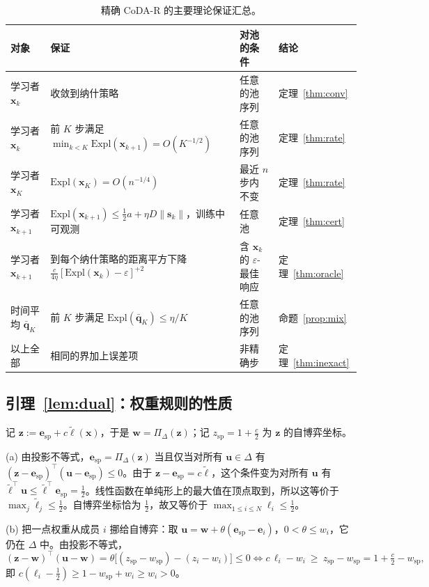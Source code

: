 \documentclass{article}
\theoremstyle{plain}
\theoremstyle{remark}
\newcommand{\Expl}{\mathrm{Expl}}
\newcommand{\Proj}{\Pi}
\newcommand{\simplex}{\Delta}
\newcommand{\bx}{{\bm{x}}}
\newcommand{\bw}{{\bm{w}}}
\newcommand{\bz}{{\bm{z}}}
\newcommand{\bu}{{\bm{u}}}
\newcommand{\bq}{{\bm{q}}}
\newcommand{\be}{{\bm{e}}}
\newcommand{\bell}{{\bm{\ell}}}
\newcommand{\aug}{\tilde{\bell}}
\newcommand{\dx}{{\bm{s}}}
\newcommand{\esp}{\be_{\mathrm{sp}}}
\newcommand{\wsp}{w_{\mathrm{sp}}}
\newcommand{\codar}{CoDA-R}
\begin{document}
\begin{table}[!htbp]
\caption{精确 \codar{} 的主要理论保证汇总。}
\label{tab:guarantees}
\begin{center}
\footnotesize
\setlength{\tabcolsep}{3.5pt}
\begin{tabular}{p{2.1cm}p{5.2cm}p{3.3cm}l}
\toprule
对象 & 保证 & 对池的条件 & 结论 \\
\midrule
学习者 $\bx_k$ & 收敛到纳什策略 & 任意的池序列 & 定理~\ref{thm:conv} \\
学习者 $\bx_k$ & 前 $K$ 步满足 $\min_{k<K}\Expl(\bx_{k+1})=O(K^{-1/2})$ & 任意的池序列 & 定理~\ref{thm:rate} \\
学习者 $\bx_K$ & $\Expl(\bx_K)=O(n^{-1/4})$ & 最近 $n$ 步内不变 & 定理~\ref{thm:rate} \\
学习者 $\bx_{k+1}$ & $\Expl(\bx_{k+1})\le\tfrac12a+\eta D\|\dx_k\|$，训练中可观测 & 任意池 & 定理~\ref{thm:cert} \\
学习者 $\bx_{k+1}$ & 到每个纳什策略的距离平方下降 $\tfrac{c}{4\eta}[\Expl(\bx_k)-\varepsilon]^{+2}$ & 含 $\bx_k$ 的 $\varepsilon$-最佳响应 & 定理~\ref{thm:oracle} \\
时间平均 $\bar{\bq}_K$ & 前 $K$ 步满足 $\Expl(\bar{\bq}_K)\le\eta/K$ & 任意的池序列 & 命题~\ref{prop:mix} \\
以上全部 & 相同的界加上误差项 & 非精确步 & 定理~\ref{thm:inexact} \\
\bottomrule
\end{tabular}
\end{center}
\end{table}

\subsection{引理~\ref{lem:dual}：权重规则的性质}
\label{app:dual}

记 $\bz:=\esp+c\aug(\bx)$，于是 $\bw=\Proj_\simplex(\bz)$；记 $z_{\mathrm{sp}}=1+\tfrac c2$ 为 $\bz$ 的自博弈坐标。

(a) 由投影不等式，$\esp=\Proj_\simplex(\bz)$ 当且仅当对所有 $\bu\in\simplex$ 有 $(\bz-\esp)^\top(\bu-\esp)\le0$。由于 $\bz-\esp=c\aug$，这个条件变为对所有 $\bu$ 有 $\aug^\top \bu\le\aug^\top \esp=\tfrac12$。线性函数在单纯形上的最大值在顶点取到，所以这等价于 $\max_j\tilde\ell_j\le\tfrac12$。自博弈坐标恰为 $\tfrac12$，故又等价于 $\max_{1\le i\le N}\ell_i\le\tfrac12$。

(b) 把一点权重从成员 $i$ 挪给自博弈：取 $\bu=\bw+\theta(\esp-\be_i)$，$0<\theta\le w_i$，它仍在 $\simplex$ 中。由投影不等式，
\[
(\bz-\bw)^\top(\bu-\bw)=\theta\big[(z_{\mathrm{sp}}-\wsp)-(z_i-w_i)\big]\le0
\iff c\,\ell_i-w_i\ \ge\ z_{\mathrm{sp}}-\wsp=1+\tfrac c2-\wsp ,
\]
即 $c(\ell_i-\tfrac12)\ge1-\wsp+w_i\ge w_i>0$。
\end{document}
